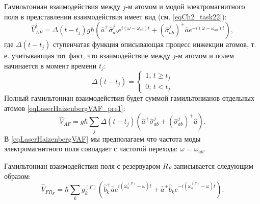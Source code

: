Гамильтониан взаимодействия между $j$-м атомом и модой
электромагнитного поля в представлении
взаимодействия имеет вид (см. \ref{eqCh2_task22}):
\begin{equation}
\hat{V}_{AF}^j =
\Delta\left(t - t_j\right) 
g \hbar \left(
\hat{a}^{+}\hat{\sigma}^{j}_{ab} e^{i \left(\omega -
  \omega_{ab}\right)t} +
\left(\hat{\sigma}^{j}_{ab}\right)^{+} 
\hat{a} e^{-i \left(\omega - \omega_{ab}\right)t}
\right),
\label{eqLaserHaizenbergVAF_pre1}
\end{equation}
где $\Delta\left(t - t_j\right)$ ступенчатая функция описывающая
процесс инжекции атомов, т. е. учитывающая тот факт, что
взаимодействие между $j$-м атомом и полем начинается в момент времени $t_j$:
\begin{equation}
\Delta\left(t - t_j\right) =
\left\{
\begin{array}{c}
1;\, t \ge t_j \\
0;\, t < t_j 
\end{array}
\right.
\nonumber
\end{equation}
Полный гамильтониан взаимодействия будет суммой гамильтонианов
отдельных атомов
\eqref{eqLaserHaizenbergVAF_pre1}:
\begin{equation}
\hat{V}_{AF} =
g \hbar
\sum_j
\Delta\left(t - t_j\right) 
 \left(
\hat{a}^{+}\hat{\sigma}^{j}_{ab}  +
\left(\hat{\sigma}^{j}_{ab}\right)^{+} 
\hat{a}
\right).
\label{eqLaserHaizenbergVAF}
\end{equation}
В \eqref{eqLaserHaizenbergVAF} мы предполагаем что частота моды
электромагнитного поля совпадает с частотой перехода: $\omega =
\omega_{ab}$.

Гамильтониан взаимодействия поля с резервуаром $R_F$ записывается
следующим образом: 
\begin{equation}
\hat{V}_{FR_F} =
\hbar
\sum_k
g_k^{(F)}
 \left(
\hat{b}_k^{+}\hat{a} e^{i\left(\omega_k^{(F)} - \omega\right)t} +
\hat{a}^{+}\hat{b}_k e^{-i\left(\omega_k^{(F)} - \omega\right)t}
\right).
\label{eqLaserHaizenbergVFRF}
\end{equation}


